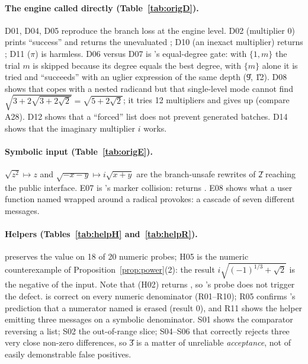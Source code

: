 \paragraph{The engine called directly (Table~\ref{tab:origD}).}
D01, D04, D05 reproduce the branch loss at the engine level. D02 (multiplier
$0$) prints ``success'' and returns the unevaluated \code{{}[[1]]}; D10 (an
inexact multiplier) returns ; D11 ($\pi$) is harmless. D06
versus D07 is \RII's equal-degree gate: with $\{1,m\}$ the trial $m$ is skipped
because its degree equals the best degree, with $\{m\}$ alone it is tried and
``succeeds'' with an uglier expression of the same depth (\U{9}, \U{12}). D08
shows that  copes with a nested radicand but that
single-level mode cannot find $\sqrt{3+2\sqrt{3+2\sqrt2}}=\sqrt{5+2\sqrt2}$; it
tries 12 multipliers and gives up (compare A28). D12 shows that a ``forced''
list does not prevent generated batches. D14 shows that the imaginary
multiplier $i$ works.


\paragraph{Symbolic input (Table~\ref{tab:origE}).}
$\sqrt{z^2}\mapsto z$ and $\sqrt{-x-y}\mapsto i\sqrt{x+y}$ are the branch-unsafe
rewrites of \U{2} reaching the public interface. E07 is \RII's marker
collision:  returns . E08 shows
what a user function named  wrapped around a radical provokes: a
cascade of seven different messages.


\paragraph{Helpers (Tables~\ref{tab:helpH} and~\ref{tab:helpR}).}
 preserves the value on 18 of 20 numeric probes; H05 is the
numeric counterexample of Proposition~\ref{prop:power}(2): the result
$i\sqrt{(-1)^{1/3}+\sqrt2}$ is the negative of the input. Note that
 (H02) returns , so \RI's
probe does not trigger the defect.  is correct on
every numeric denominator (R01--R10); R05 confirms \RII's prediction that a
numerator named  is erased (result 0), and R11 shows the helper
emitting three messages on a symbolic denominator. S01 shows the comparator
reversing a list; S02 the out-of-range slice; S04--S06 that
 correctly rejects three very close non-zero differences,
so \U{3} is a matter of unreliable \emph{acceptance}, not of easily
demonstrable false positives.



